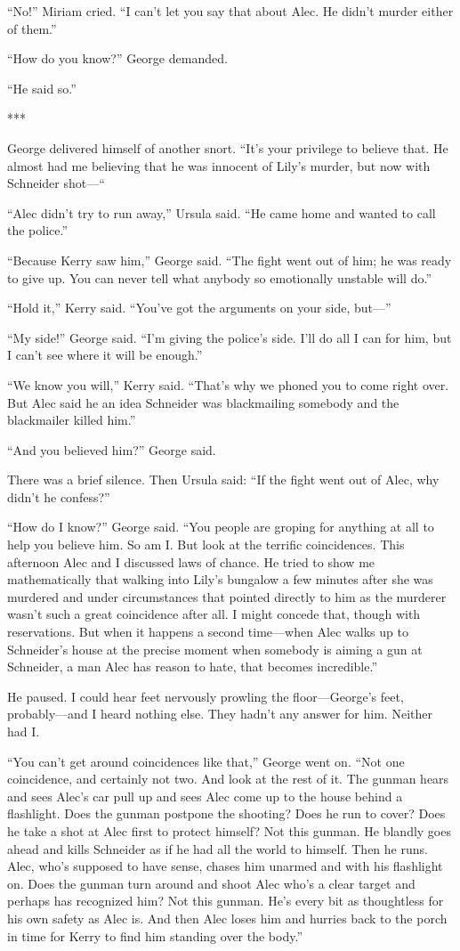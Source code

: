 \documentclass{novel}
\begin{document}
{“No!” Miriam cried. “I can’t let you say that about Alec. He didn’t murder either of them.”

“How do you know?” George demanded.

“He said so.”

***

George delivered himself of another snort. “It’s your privilege to believe that. He almost had me believing that he was innocent of Lily’s murder, but now with Schneider shot—“

“Alec didn’t try to run away,” Ursula said. “He came home and wanted to call the police.”

“Because Kerry saw him,” George said. “The fight went out of him; he was ready to give up. You can never tell what anybody so emotionally unstable will do.”

“Hold it,” Kerry said. “You’ve got the arguments on your side, but—”

“My side!” George said. “I’m giving the police’s side. I’ll do all I can for him, but I can’t see where it will be enough.”

“We know you will,” Kerry said. “That’s why we phoned you to come right over. But Alec said he an idea Schneider was blackmailing somebody and the blackmailer killed him.”

“And you believed him?” George said.

There was a brief silence. Then Ursula said: “If the fight went out of Alec, why didn’t he confess?”

“How do I know?” George said. “You people are groping for anything at all to help you believe him. So am I. But look at the terrific coincidences. This afternoon Alec and I discussed laws of chance. He tried to show me mathematically that walking into Lily’s bungalow a few minutes after she was murdered and under circumstances that pointed directly to him as the murderer wasn’t such a great coincidence after all. I might concede that, though with reservations. But when it happens a second time—when Alec walks up to Schneider’s house at the precise moment when somebody is aiming a gun at Schneider, a man Alec has reason to hate, that becomes incredible.”

He paused. I could hear feet nervously prowling the floor—George’s feet, probably—and I heard nothing else. They hadn’t any answer for him. Neither had I.

“You can’t get around coincidences like that,” George went on. “Not one coincidence, and certainly not two. And look at the rest of it. The gunman hears and sees Alec’s car pull up and sees Alec come up to the house behind a flashlight. Does the gunman postpone the shooting? Does he run to cover? Does he take a shot at Alec first to protect himself? Not this gunman. He blandly goes ahead and kills Schneider as if he had all the world to himself. Then he runs. Alec, who’s supposed to have sense, chases him unarmed and with his flashlight on. Does the gunman turn around and shoot Alec who’s a clear target and perhaps has recognized him? Not this gunman. He’s every bit as thoughtless for his own safety as Alec is. And then Alec loses him and hurries back to the porch in time for Kerry to find him standing over the body.”

}
\end{document}
